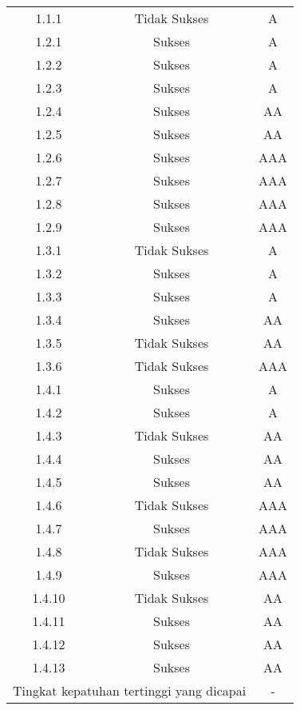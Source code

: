 \begin{table}[H]
\begin{tabular}{|c|c|c|}
        \midrule
        \rowcolor{darkred} 1.1.1 & Tidak Sukses & A \\
        1.2.1 & Sukses & A \\
        1.2.2 & Sukses & A \\
        1.2.3 & Sukses & A \\
        1.2.4 & Sukses & AA \\
        1.2.5 & Sukses & AA \\
        1.2.6 & Sukses & AAA \\
        1.2.7 & Sukses & AAA \\
        1.2.8 & Sukses & AAA \\
        1.2.9 & Sukses & AAA \\
        \rowcolor{darkred} 1.3.1 & Tidak Sukses & A \\
        1.3.2 & Sukses & A \\
        1.3.3 & Sukses & A \\
        1.3.4 & Sukses & AA \\
        \rowcolor{brightred} 1.3.5 & Tidak Sukses & AA \\
        \rowcolor{pink} 1.3.6 & Tidak Sukses & AAA \\
        1.4.1 & Sukses & A \\
        1.4.2 & Sukses & A \\
        \rowcolor{brightred} 1.4.3 & Tidak Sukses & AA \\
        1.4.4 & Sukses & AA \\
        1.4.5 & Sukses & AA \\
        \rowcolor{pink} 1.4.6 & Tidak Sukses & AAA \\
        1.4.7 & Sukses & AAA \\
        \rowcolor{pink} 1.4.8 & Tidak Sukses & AAA \\
        1.4.9 & Sukses & AAA \\
        \rowcolor{brightred} 1.4.10 & Tidak Sukses & AA \\
        1.4.11 & Sukses & AA \\
        1.4.12 & Sukses & AA \\
        1.4.13 & Sukses & AA \\
        
        \bottomrule
        \multicolumn{2}{|c|}{Tingkat kepatuhan tertinggi yang dicapai} & - \\
        \bottomrule

    \end{tabular}
\end{table}

